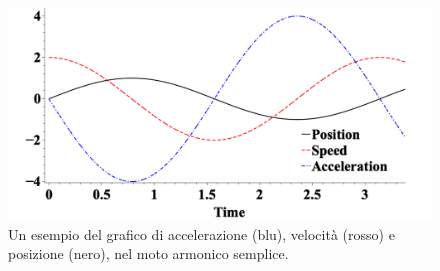 \begin{figure}[htbp]
    \begin{center}
        \includegraphics[width=13cm]{images/MA.png} 
        \caption{Un esempio del grafico di accelerazione (blu), velocità
        (rosso) e posizione (nero), nel moto armonico semplice.
        }
    \end{center}
\label{fig:MA}
\end{figure}